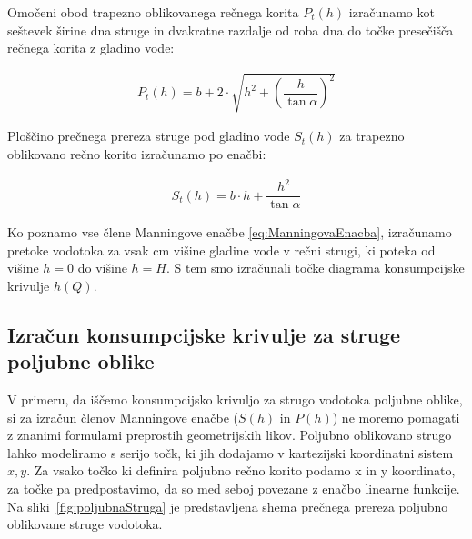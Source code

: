 \begin{enumerate}
	Omočeni obod trapezno oblikovanega rečnega korita $P_t(h)$ izračunamo kot seštevek širine dna struge in dvakratne razdalje od roba dna do točke presečišča rečnega korita z gladino vode:
	
	\begin{ceqn}
	\begin{align}
	P_{t}(h) = b + 2 \cdot \sqrt{h^2 + \left(\dfrac{h} {\tan\alpha} \right)^{2}}
	\end{align}
	\end{ceqn}
	
	Ploščino prečnega prereza struge pod gladino vode $S_t(h)$ za trapezno oblikovano rečno korito izračunamo po enačbi:
	\begin{ceqn}
	\begin{align}
	S_{t}(h) = b \cdot h + \dfrac{h^2}{\tan\alpha}
	\end{align}
	\end{ceqn}
	
\end{enumerate}



Ko poznamo vse člene Manningove enačbe \ref{eq:ManningovaEnacba}, izračunamo pretoke vodotoka za vsak cm višine gladine vode v rečni strugi, ki poteka od višine $h=0$ do višine $h=H$. S tem smo izračunali točke diagrama konsumpcijske krivulje $h(Q)$.



\subsection{Izračun konsumpcijske krivulje za struge poljubne oblike} \label{sec:teorija_metodaPoljubnaOblika}


V primeru, da iščemo konsumpcijsko krivuljo za strugo vodotoka poljubne oblike, si za izračun členov Manningove enačbe ($S(h)$ in $P(h)$) ne moremo pomagati z znanimi formulami preprostih geometrijskih likov. Poljubno oblikovano strugo lahko modeliramo s serijo točk, ki jih dodajamo v kartezijski koordinatni sistem $x,y$. Za vsako točko ki definira poljubno rečno korito podamo x in y koordinato, za točke pa predpostavimo, da so med seboj povezane z enačbo linearne funkcije. Na sliki~\ref{fig:poljubnaStruga} je predstavljena shema prečnega prereza poljubno oblikovane struge vodotoka.

